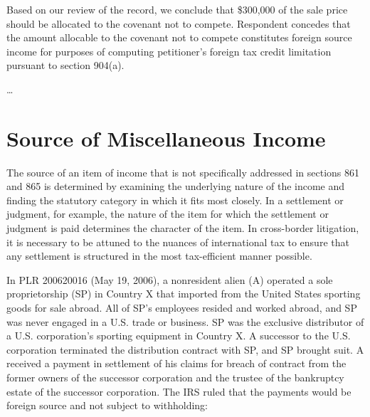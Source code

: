 \begin{select}
Based on our review of the record, we conclude that \$300,000 of the sale price should be allocated to the covenant
not to compete. Respondent concedes that the amount allocable to the covenant not to compete constitutes foreign source
income for purposes of computing petitioner's foreign tax credit limitation pursuant to section 904(a).


\ldots
\end{select}


\section{Source of Miscellaneous Income}

The source of an item of income that is not specifically addressed in sections 861 and 865 is determined by examining the underlying nature of the income and finding the statutory category in which it fits most closely.  In a settlement or judgment, for example, the nature of the item for which the settlement or judgment is paid determines the character of the item.  In cross-border litigation, it is necessary to be attuned to the nuances of international tax to ensure that any settlement is structured in the most tax-efficient manner possible.  

In PLR 200620016 (May 19, 2006), a nonresident alien (A) operated a sole proprietorship (SP) in Country X that imported from the United States sporting goods for sale abroad.  All of SP's employees  resided and worked abroad, and SP was  never engaged in a U.S. trade or business.  SP was the exclusive distributor of a U.S. corporation's sporting equipment in Country X.  A successor to the U.S. corporation terminated the distribution contract with SP, and SP brought suit.  A received a payment in settlement of his claims for breach of contract  from the former owners of the successor corporation and the  trustee of the bankruptcy estate of the successor corporation.  The IRS ruled that the payments would be foreign source and not subject to withholding:

